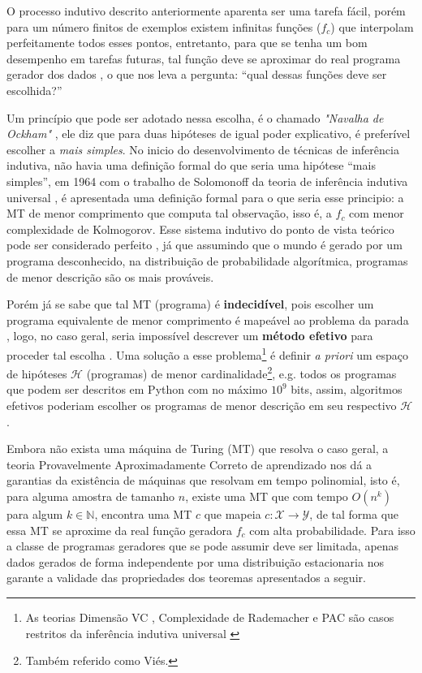 O processo indutivo descrito anteriormente aparenta ser uma tarefa fácil, porém
para um número finitos de exemplos existem infinitas funções ($f_c$) que
interpolam perfeitamente todos esses
pontos\cite{bishop2006pattern,abu2012learning}, entretanto, para que se tenha
um bom desempenho em tarefas futuras, tal função deve se aproximar do real
programa gerador dos dados
\cite{mohri2018foundations,goodfellow2016deep,solomonoff1964formal,kearns1994introduction},
o que nos leva a pergunta: ``qual dessas funções deve ser escolhida?''

Um princípio que pode ser adotado nessa escolha, é o chamado \textit{"Navalha
de Ockham"} \cite{blumer1987occam}, ele diz que para duas hipóteses de igual
poder explicativo, é preferível escolher a \textit{mais simples}. No inicio do
desenvolvimento de técnicas de inferência indutiva, não havia uma definição
formal do que seria uma hipótese ``mais simples'', em 1964 com o trabalho de
Solomonoff da teoria de inferência indutiva universal
\cite{solomonoff1964formal}, é apresentada uma definição formal para o que
seria esse principio: a MT de menor comprimento que computa tal observação,
isso é, a $f_c$ com menor complexidade de Kolmogorov. Esse sistema indutivo do
ponto de vista teórico pode ser considerado perfeito \cite{li1992inductive}, já
que assumindo que o mundo é gerado por um programa desconhecido, na
distribuição de probabilidade algorítmica, programas de menor descrição são os
mais prováveis.

Porém já se sabe que tal MT (programa) é \textbf{indecidível}, pois escolher um
programa equivalente de menor comprimento é mapeável ao problema da parada
\cite{sipser2012introduction,solomonoff1978complexity}, logo, no caso geral,
seria impossível descrever um \textbf{método efetivo} para proceder tal escolha
\cite{hutter2004universal}. Uma solução a esse problema\footnote{As teorias
Dimensão VC \cite{vapnik2013nature}, Complexidade de Rademacher
\cite{bartlett2002rademacher} e PAC \cite{valiant1984theory} são casos
restritos da inferência indutiva universal
\cite{li1992inductive,blumer1989learnability}} é definir \textit{a priori} um
espaço de hipóteses $\mathcal{H}$ (programas) de menor
cardinalidade\footnote{Também referido como Viés.}, e.g. todos os programas que
podem ser descritos em Python com no máximo $10^9$ bits, assim, algoritmos
efetivos poderiam escolher os programas de menor descrição em seu respectivo
$\mathcal{H}$ \cite{rathmanner2011philosophical}.

Embora não exista uma máquina de Turing (MT) que resolva o caso geral, a teoria
Provavelmente Aproximadamente Correto de aprendizado nos dá a garantias da
existência de máquinas que resolvam em tempo polinomial, isto é, para alguma
amostra de tamanho $n$, existe uma MT que com tempo $O(n^k)$ para algum $k \in
\mathbb{N}$, encontra uma MT $c$ que mapeia
$c:\mathcal{X}\rightarrow\mathcal{Y}$, de tal forma que essa MT se aproxime da
real função geradora $f_c$ com alta probabilidade. Para isso a classe de
programas geradores que se pode assumir deve ser limitada, apenas dados gerados
de forma independente por uma distribuição estacionaria nos garante a validade
das propriedades dos teoremas apresentados a seguir.

